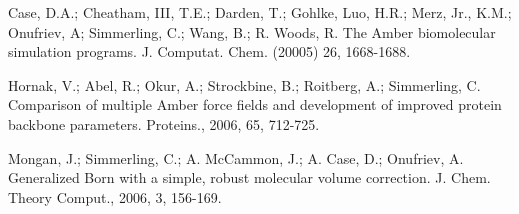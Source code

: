 \documentclass[12pt]{article}
\begin{document}
\begin{thebibliography}{99}
Case, D.A.; Cheatham, III, T.E.; Darden, T.; Gohlke, Luo, H.R.; Merz, Jr., K.M.;  Onufriev, A; Simmerling, C.;
Wang, B.; R. Woods, R. The Amber biomolecular simulation programs. J. Computat. Chem. (20005) 26, 1668-1688.

Hornak, V.; Abel, R.; Okur, A.; Strockbine, B.; Roitberg, A.; Simmerling, C. Comparison of multiple Amber force fields
and development of improved protein backbone parameters. Proteins., 2006, 65, 712-725.

Mongan, J.; Simmerling, C.; A. McCammon, J.; A. Case, D.; Onufriev, A. Generalized
Born with a simple, robust molecular volume correction. J. Chem. Theory Comput.,
2006, 3, 156-169.


\end{thebibliography}
\end{document}
